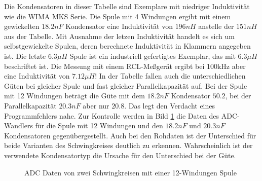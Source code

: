 Die Kondensatoren in dieser Tabelle sind Exemplare mit niedriger Induktivität wie
die WIMA MKS Serie. Die Spule mit 4 Windungen ergibt mit einem gewickelten \(18.2nF\)
Kondensator eine Induktivität von \(196nH\) anstelle der \(151nH\) aus der Tabelle.
Mit Ausnahme der letzen Induktivität handelt es sich um selbstgewickelte Spulen,
deren berechnete Induktivität in Klammern angegeben ist. Die letzte \(6.3\mu H\) Spule
ist ein industriell gefertigtes Exemplar, das mit \(6.3\mu H\) beschriftet ist.
Die Messung mit einem RCL-Meßgerät ergibt bei 100kHz aber eine Induktivität von \(7.12\mu H\)!
In der Tabelle fallen auch die unterschiedlichen Güten bei gleicher Spule und fast gleicher
Parallelkapazität auf. Bei der Spule mit 12 Windungen beträgt die Güte mit dem \(18.2nF\)
Kondensator \(50.2\), bei der Parallelkapazität \(20.3nF\) aber nur \(20.8\).
Das legt den Verdacht eines Programmfehlers nahe.
Zur Kontrolle werden in Bild \ref{fig:W12compare} die Daten des ADC-Wandlers 
für die Spule mit 12 Windungen und den \(18.2nF\) und \(20.3nF\) Kondensatoren gegenübergestellt.
Auch bei den Rohdaten ist der Unterschied für beide Varianten des Schwingkreises deutlich
zu erkennen. Wahrscheinlich ist der verwendete Kondensatortyp die Ursache für den Unterschied
bei der Güte.

\begin{figure}[H]
\centering

\caption{ADC Daten von zwei Schwingkreisen mit einer 12-Windungen Spule}
\label{fig:W12compare}
\end{figure}


